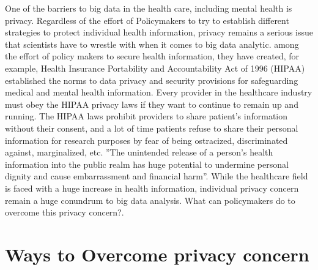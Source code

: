 \documentclass[sigconf]{acmart}
\begin{document}
One of the barriers to big data in the health care, including mental health is privacy. Regardless of the effort of Policymakers to try to establish different strategies to protect individual health information, privacy remains a serious issue that scientists have to wrestle with when it comes to big data analytic. among the effort of policy makers to secure health information, they have created, for example, Health Insurance Portability and Accountability Act of 1996 (HIPAA) established the norms to data privacy and security provisions for safeguarding medical and mental health information. Every provider in the healthcare industry must obey the HIPAA privacy laws if they want to continue to remain up and running. The HIPAA laws prohibit providers to share patient's information without their consent, and a lot of time patients refuse to share their personal information for research purposes by fear of being ostracized, discriminated against, marginalized, etc. ''The unintended release of a person’s health information into the public realm has huge potential to undermine personal dignity and cause embarrassment and financial harm''\cite{van2011health}. While the healthcare field is faced with a huge increase in health information, individual privacy concern remain a huge conundrum to big data analysis. What can policymakers do to overcome this privacy concern?\cite{cavoukian2012privacy}.

\section{Ways to Overcome privacy concern}
\end{document}
